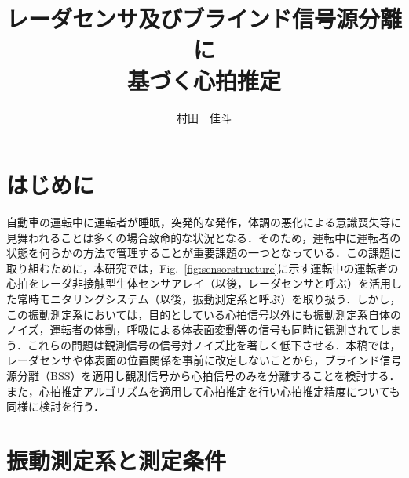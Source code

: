\documentclass[a4j]{jsarticle}
\title{レーダセンサ及びブラインド信号源分離に\\基づく心拍推定}
\author{村田　佳斗}
\begin{document}
\maketitle%



\thispagestyle{empty}
\pagestyle{empty}

\section{はじめに}

自動車の運転中に運転者が睡眠，突発的な発作，体調の悪化による意識喪失等に見舞われることは多くの場合致命的な状況となる．そのため，運転中に運転者の状態を何らかの方法で管理することが重要課題の一つとなっている．この課題に取り組むために，本研究では，Fig.~\ref{fig:sensorstructure}に示す運転中の運転者の心拍をレーダ非接触型生体センサアレイ（以後，レーダセンサと呼ぶ）を活用した常時モニタリングシステム（以後，振動測定系と呼ぶ）を取り扱う．しかし，この振動測定系においては，目的としている心拍信号以外にも振動測定系自体のノイズ，運転者の体動，呼吸による体表面変動等の信号も同時に観測されてしまう．これらの問題は観測信号の信号対ノイズ比を著しく低下させる．本稿では，レーダセンサや体表面の位置関係を事前に改定しないことから，ブラインド信号源分離（BSS）\cite{originica}を適用し観測信号から心拍信号のみを分離することを検討する．また，心拍推定アルゴリズムを適用して心拍推定を行い心拍推定精度についても同様に検討を行う．

\section{振動測定系と測定条件}
\end{document}
